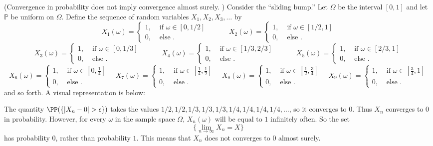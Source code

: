 \documentclass{ximera}
\begin{document}
\begin{example}
(Convergence in probability does not imply convergence almost surely. )
Consider the ``sliding bump.'' Let $\Omega$ be the interval $[0,1]$ and let $\mathbb{P}$ be uniform on $\Omega$. Define the sequence of random variables $X_1,X_2,X_3,\ldots$ by 
$$
X_1(\omega) 
= 
\begin{cases}
1, & \text{ if } \omega \in [0,1/2] \\
0, & \text{ else }.
\end{cases}
\quad \quad \quad 
X_2(\omega) 
= 
\begin{cases}
1, & \text{ if } \omega \in [1/2,1] \\
0, & \text{ else }.
\end{cases}
$$
$$
X_3(\omega) 
= 
\begin{cases}
1, & \text{ if } \omega \in [0,1/3] \\
0, & \text{ else }.
\end{cases}
\quad \quad \quad 
X_4(\omega) 
= 
\begin{cases}
1, & \text{ if } \omega \in [1/3,2/3] \\
0, & \text{ else }.
\end{cases}
\quad \quad \quad 
X_5(\omega) 
= 
\begin{cases}
1, & \text{ if } \omega \in [2/3,1] \\
0, & \text{ else }.
\end{cases}
$$
\small
$$
X_6(\omega) 
= 
\begin{cases}
1, & \text{ if } \omega \in [0,\tfrac{1}{4}] \\
0, & \text{ else }.
\end{cases}
\quad   
X_7(\omega) 
= 
\begin{cases}
1, & \text{ if } \omega \in [\tfrac{1}{4},\tfrac{1}{2}] \\
0, & \text{ else }.
\end{cases}
\quad   
X_8(\omega) 
= 
\begin{cases}
1, & \text{ if } \omega \in [\tfrac{1}{2},\tfrac{3}{4}] \\
0, & \text{ else }.
\end{cases}
\quad
X_9(\omega) 
= 
\begin{cases}
1, & \text{ if } \omega \in [\tfrac{3}{4},1] \\
0, & \text{ else }.
\end{cases}
$$
\normalsize
and so forth. A visual representation is below:


The quantity $\PP(\{\vert X_n - 0\vert >\epsilon\})$ takes the values $1/2,1/2,1/3,1/3,1/3,1/4,1/4,1/4,1/4,\ldots$, so it converges to $0$. Thus $X_n$ converges to $0$ in probability. 
However, for every $\omega$ in the sample space $\Omega$, $X_n(\omega)$ will be equal to $1$ infinitely often. So the set
$$
\{\lim_{n\rightarrow\infty} X_n = X\}
$$
has probability $0$, rather than probability $1$. This means that $X_n$ does not converges to $0$ almost surely.

\end{example}
\end{document}
